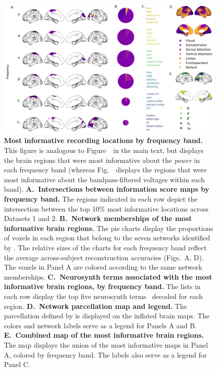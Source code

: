 \documentclass[11pt]{article}
\begin{document}
\begin{figure}[p]
\centering \includegraphics[width=\textwidth]{figs/supplemental_5}
\caption{\textbf{Most informative recording locations by frequency band.} This
figure is analogous to Figure~\infomapfreqs~in the main text, but displays the
brain regions that were most informative about the \textit{power} in each
frequency band (whereas Fig.~\infomapfreqs~displays the regions that were most
informative about the bandpass-filtered voltages within each band).
\textbf{A.~Intersections between information score maps by frequency band.} The
regions indicated in each row depict the intersection between the top 10\% most
informative locations across Datasets 1 and 2.  \textbf{B.~Network memberships
of the most informative brain regions.}  The pie charts display the proportions
of voxels in each region that belong to the seven networks identified by
\cite{YeoEtal11}.  The relative sizes of the charts for each frequency band
reflect the average across-subject reconstruction accuracies
(Figs.~\freqs A, D).  The voxels in Panel A are colored according to
the same network memberships.  \textbf{C.~Neurosynth terms associated with the
most informative brain regions, by frequency band.}  The lists in each row
display the top five neurosynth terms~\citep{RubiEtal17} decoded for each
region.  \textbf{D.~Network parcellation map and legend.}  The parcellation
defined by \cite{YeoEtal11} is displayed on the inflated brain maps.  The colors
and network labels serve as a legend for Panels A and B. \textbf{E.~Combined map
of the most informative brain regions.}  The map displays the union of the most
informative maps in Panel A, colored by frequency band.  The labels also serve
as a legend for Panel C.}
\label{fig:supplemental_5}
\end{figure}
\end{document}
